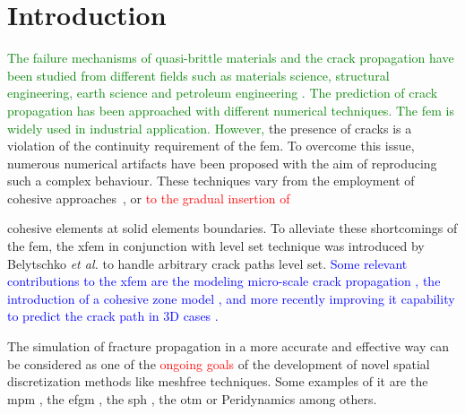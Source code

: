 \documentclass[preprint,12pt,a4paper]{elsarticle}
\newcommand{\PNA}[1]{
  \textcolor{red}{{#1}}
}
\newcommand{\MMP}[1]{
  \textcolor{blue}{{#1}}
}
\newcommand{\DM}[1]{
  \textcolor{green}{{#1}}
}
\begin{document}
\section{Introduction}
\label{sec:1}
\DM{The failure mechanisms of quasi-brittle materials and the  crack propagation have been studied from different fields such as materials science, structural engineering, earth science and petroleum engineering . The prediction of crack propagation has been approached with different numerical techniques. The \acrfull{fem} is widely used in industrial application. However,} the presence of cracks is a violation of the continuity requirement of the \acrshort{fem}. To overcome this issue, numerous numerical
artifacts have been proposed with the aim of reproducing such a
complex behaviour. These techniques vary from the employment of cohesive
approaches~\cite{Barenblatt,Hilleborg_1976}, or \PNA{to the gradual insertion of}
cohesive elements \cite{Ortiz_1999,Pandolfi_2002,Ruiz_2000} at solid
elements boundaries. To alleviate these shortcomings of the
\acrshort{fem}, the \acrfull{xfem} in conjunction with level set
technique was introduced by Belytschko {\it et al.}
\cite{Belytschko_03} to handle arbitrary crack paths level
set. \MMP{Some relevant contributions to the \acrshort{xfem} are the
modeling micro-scale crack propagation \cite{HUANG_2018}, the
introduction of a cohesive zone model \cite{NAGASHIMA_2016}, and more
recently improving it capability to predict the crack path in 3D cases
\cite{YUN_2019}.}

The simulation of fracture propagation in a more accurate and effective
way can be considered as one of the \PNA{ongoing goals} of the development of novel spatial discretization methods like meshfree techniques. Some
examples of it are the \acrfull{mpm}
\cite{Schreyer_2002,Chen_2002,Nairn_2003,Zhenmao_2005}, the
\acrfull{efgm} \cite{BELYTSCHKO_1995,BELYTSCHKO_2000,Zhuang_2012,Muthu_2013}, the
\acrfull{sph} \cite{Wang_2020,Wang_2019}, the \acrfull{otm} \cite{Li2010,Li_2012,Pandolfi_2013,Li_2015} or Peridynamics
\cite{HA_2011,RABCZUK_2017} among others. \\
\end{document}
